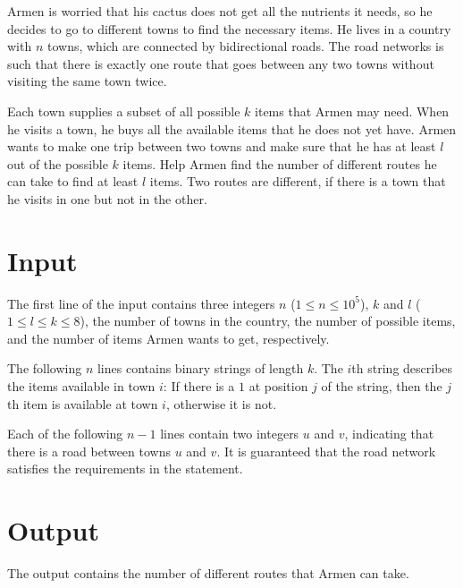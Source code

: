 
Armen is worried that his cactus does not get all the nutrients it needs, so he decides to go to different towns to find the necessary items.
He lives in a country with $n$ towns, which are connected by bidirectional roads.
The road networks is such that there is exactly one route that goes between any two towns without visiting the same town twice.

Each town supplies a subset of all possible $k$ items that Armen may need.
When he visits a town, he buys all the available items that he does not yet have.
Armen wants to make one trip between two towns and make sure that he has at least $l$ out of the possible $k$ items.
Help Armen find the number of different routes he can take to find at least $l$ items.
Two routes are different, if there is a town that he visits in one but not in the other.


\section*{Input}
The first line of the input contains three integers $n$ ($1 \leq n \leq 10^5$), $k$ and $l$ ($1 \leq l \leq k \leq 8$), the number of towns in the country, the number of possible items, and the number of items Armen wants to get, respectively.

The following $n$ lines contains binary strings of length $k$.
The $i$th string describes the items available in town $i$:
If there is a $1$ at position $j$ of the string, then the $j$th item is available at town $i$, otherwise it is not.

Each of the following $n - 1$ lines contain two integers $u$ and $v$, indicating that there is a road between towns $u$ and $v$.
It is guaranteed that the road network satisfies the requirements in the statement.

\section*{Output}
The output contains the number of different routes that Armen can take.

